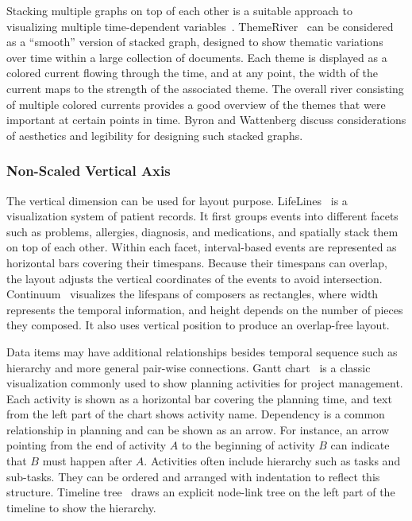 Stacking multiple graphs on top of each other is a suitable approach to visualizing multiple time-dependent variables~\cite{Aigner2011}. ThemeRiver~\cite{Havre2002} can be considered as a ``smooth'' version of stacked graph, designed to show thematic variations over time within a large collection of documents. Each theme is displayed as a colored current flowing through the time, and at any point, the width of the current maps to the strength of the associated theme. The overall river consisting of multiple colored currents provides a good overview of the themes that were important at certain points in time. Byron and Wattenberg discuss considerations of aesthetics and legibility for designing such stacked graphs.

\subsubsection{Non-Scaled Vertical Axis}
The vertical dimension can be used for layout purpose. LifeLines~\cite{Plaisant1996,Plaisant1998} is a visualization system of patient records. It first groups events into different facets such as problems, allergies, diagnosis, and medications, and spatially stack them on top of each other. Within each facet, interval-based events are represented as horizontal bars covering their timespans. Because their timespans can overlap, the layout adjusts the vertical coordinates of the events to avoid intersection. Continuum~\cite{Andre2007} visualizes the lifespans of composers as rectangles, where width represents the temporal information, and height depends on the number of pieces they composed. It also uses vertical position to produce an overlap-free layout.

Data items may have additional relationships besides temporal sequence such as hierarchy and more general pair-wise connections. Gantt chart~\cite{Gantt1913} is a classic visualization commonly used to show planning activities for project management. Each activity is shown as a horizontal bar covering the planning time, and text from the left part of the chart shows activity name. Dependency is a common relationship in planning and can be shown as an arrow. For instance, an arrow pointing from the end of activity $A$ to the beginning of activity $B$ can indicate that $B$ must happen after $A$. Activities often include hierarchy such as tasks and sub-tasks. They can be ordered and arranged with indentation to reflect this structure. Timeline tree~\cite{Burch2008} draws an explicit node-link tree on the left part of the timeline to show the hierarchy.


